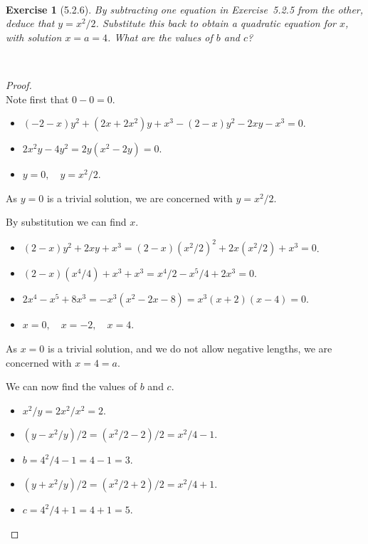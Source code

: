 \documentclass[12pt]{article}
\newcommand{\XB}{\color{black}}
\newcommand{\XBB}{\color{blue}}
\newcommand{\ds}{\displaystyle}
\theoremstyle{plain}
\newtheorem{ex}{Exercise}
\begin{document}
\newpage

\XBB\hrulefill\XB \\
\begin{ex} [5.2.6]
  By subtracting one equation in Exercise~5.2.5 from the other, deduce that $y=x^2/2$. Substitute this back to obtain a quadratic equation for $x$, with solution $x=a=4$. What are the values of $b$ and $c$?
\end{ex}
\XBB\hrulefill\XB \\

\begin{proof}
  \ \\

  Note first that $ 0 - 0 = 0 $.

  \begin{itemize}
    \item $ \ds (-2 - x)y^{2} + (2x + 2x^{2})y + x^{3} - (2 - x)y^{2} - 2xy - x^{3} = 0 $.
    \item $ \ds 2x^{2}y - 4y^{2} = 2y(x^{2} - 2y) = 0 $.
    \item $ \ds y = 0, \quad y = x^{2} / 2$.
  \end{itemize}

  As $ y = 0 $ is a trivial solution, we are concerned with $ y = x^{2}/2 $.

  By substitution we can find $ x $.

  \begin{itemize}
    \item $ \ds (2 - x)y^{2} + 2xy + x^{3} = (2 - x)(x^{2}/2)^{2} + 2x(x^{2}/2) + x^{3} = 0 $.
    \item $ \ds (2 - x)(x^{4}/4) + x^{3} + x^{3} = x^{4}/2 - x^{5}/4 + 2x^{3} = 0 $.
    \item $ \ds 2x^{4} - x^{5} + 8x^{3} = -x^{3}(x^{2} -2x - 8) = x^{3}(x + 2)(x - 4) = 0 $.
    \item $ \ds x = 0, \quad x = -2, \quad x = 4 $.
  \end{itemize}

  As $ x = 0 $ is a trivial solution, and we do not allow negative lengths, we are concerned with $ x = 4 = a $.

  We can now find the values of $ b $ and $ c $.

  \begin{itemize}
    \item $ \ds x^{2}/y = 2x^{2}/x^{2} = 2 $.
    \item $ \ds (y - x^{2} / y) / 2 = (x^{2}/2 - 2) / 2 = x^{2}/4 - 1 $.
    \item $ \ds b = 4^{2}/4 - 1 = 4 - 1 = 3 $.
    \item $ \ds (y + x^{2} / y) / 2 = (x^{2}/2 + 2) / 2 = x^{2}/4 + 1 $.
    \item $ \ds c = 4^{2}/4 + 1 = 4 + 1 = 5 $.
  \end{itemize}


\end{proof}
\end{document}
